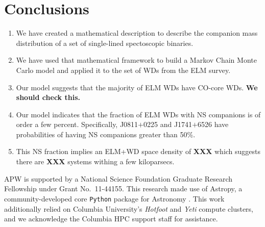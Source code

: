 \documentclass[letterpaper,12pt,preprint]{aastex}
\begin{document}
\section{Conclusions}

\begin{enumerate}
\item We have created a mathematical description to describe the companion mass distribution of a set of single-lined spectoscopic binaries. \\
\item We have used that mathematical framework to build a Markov Chain Monte Carlo model and applied it to the set of WDs from the ELM survey. \\
\item Our model suggests that the majority of ELM WDs have CO-core WDs. {\bf We should check this.} \\
\item Our model indicates that the fraction of ELM WDs with NS companions is of order a few percent. Specifically, J0811$+$0225 and J1741$+$6526 have probabilities of having NS companions greater than 50\%. \\
\item This NS fraction implies an ELM+WD space density of {\bf XXX} which suggests there are {\bf XXX} systems withing a few kiloparsecs.
\end{enumerate}

\acknowledgements
APW is supported by a National Science Foundation Graduate Research Fellowship under Grant No.\ 11-44155. 
This research made use of Astropy, a community-developed core \texttt{Python} package for Astronomy \citep{astropy13}.
This work additionally relied on Columbia University's \emph{Hotfoot} and \emph{Yeti} compute clusters, and we acknowledge the Columbia HPC support staff for assistance. \\



\end{document}

